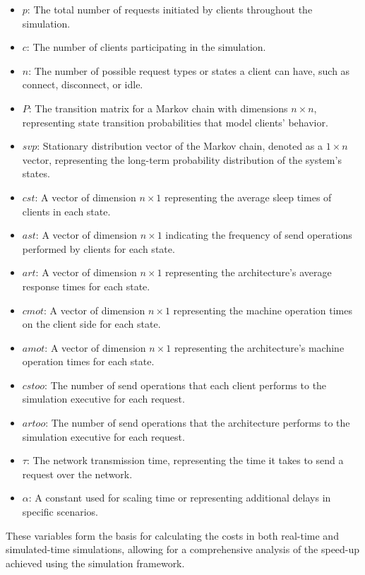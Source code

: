 \begin{itemize}
    \item \( p \): The total number of requests initiated by clients throughout the simulation.
    \item \( c \): The number of clients participating in the simulation.
    \item \( n \): The number of possible request types or states a client can have, such as connect, disconnect, or idle.
    \item \( P \): The transition matrix for a Markov chain with dimensions \( n \times n \), representing state transition probabilities that model clients’ behavior.
    \item \( svp \): Stationary distribution vector of the Markov chain, denoted as a \( 1 \times n \) vector, representing the long-term probability distribution of the system’s states.
    \item \( cst \): A vector of dimension \( n \times 1 \) representing the average sleep times of clients in each state.
    \item \( ast \): A vector of dimension \( n \times 1 \) indicating the frequency of send operations performed by clients for each state.
    \item \( art \): A vector of dimension \( n \times 1 \) representing the architecture's average response times for each state.
    \item \( cmot \): A vector of dimension \( n \times 1 \) representing the machine operation times on the client side for each state.
    \item \( amot \): A vector of dimension \( n \times 1 \) representing the architecture's machine operation times for each state.
    \item \( cstoo \): The number of send operations that each client performs to the simulation executive for each request.
    \item \( artoo \): The number of send operations that the architecture performs to the simulation executive for each request.
    \item \( \tau \): The network transmission time, representing the time it takes to send a request over the network.
    \item \( \alpha \): A constant used for scaling time or representing additional delays in specific scenarios.
\end{itemize}

These variables form the basis for calculating the costs in both real-time and simulated-time simulations, allowing for a comprehensive analysis of the speed-up achieved using the simulation framework.

